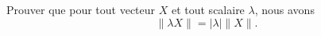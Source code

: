 
\begin{exercice}\label{exoOutilsMath-0002}

	Prouver que pour tout vecteur $X$ et tout scalaire $\lambda$, nous avons
	\begin{equation}
		\| \lambda X \|=| \lambda |\| X \|.
	\end{equation}

\end{exercice}
